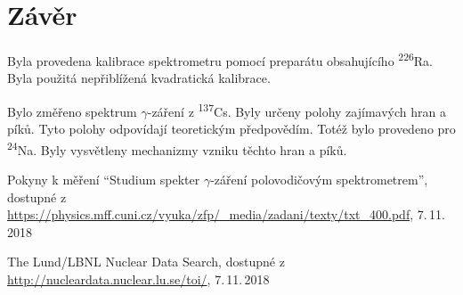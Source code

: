 \documentclass{protokol}
\begin{document}
  \section*{Závěr}

    Byla provedena kalibrace spektrometru pomocí preparátu obsahujícího \textsuperscript{226}Ra. Byla použitá nepřiblížená kvadratická kalibrace.

    Bylo změřeno spektrum $\gamma$-záření z \textsuperscript{137}Cs. Byly určeny polohy zajímavých hran a píků. Tyto polohy odpovídají teoretickým předpovědím. Totéž bylo provedeno pro \textsuperscript{24}Na. Byly vysvětleny mechanizmy vzniku těchto hran a píků.

  \begin{thebibliography}{}
 
    Pokyny k měření ``Studium spekter $\gamma$-záření polovodičovým spektrometrem'', dostupné z\\ \url{https://physics.mff.cuni.cz/vyuka/zfp/_media/zadani/texty/txt_400.pdf}, 7.\,11.\,2018

    The Lund/LBNL Nuclear Data Search, dostupné z\\ \url{http://nucleardata.nuclear.lu.se/toi/}, 7.\,11.\,2018
   
  \end{thebibliography}
\end{document}
